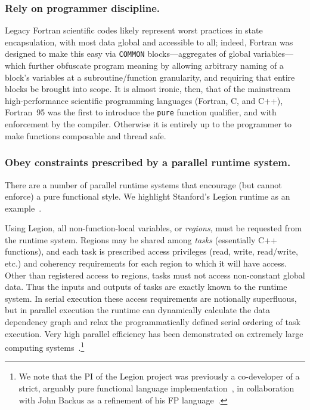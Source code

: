 \documentclass{llncs}
\begin{document}
\subsubsection{Rely on programmer discipline.}
Legacy Fortran scientific codes likely represent worst practices in state
encapsulation, with most data global and accessible to all; indeed, Fortran
was designed to make this easy via \texttt{COMMON} blocks---aggregates of
global variables---which further obfuscate program meaning by allowing
arbitrary naming of a block's variables at a subroutine/function granularity,
and requiring that entire blocks be brought into scope.  It is almost ironic,
then, that of the mainstream high-performance scientific programming languages
(Fortran, C, and C++), Fortran~95 was the first to introduce the \texttt{pure}
function qualifier, and with enforcement by the compiler.  Otherwise it is
entirely up to the programmer to make functions composable and thread safe.

\subsubsection{Obey constraints prescribed by a parallel runtime system.}
There are a number of parallel runtime systems that encourage (but cannot
enforce) a pure functional style.  We highlight Stanford's Legion
runtime as an example~\cite{Bauer12}.

Using Legion, all non-function-local variables, or \emph{regions}, must be
requested from the runtime system.  Regions may be shared among \emph{tasks}
(essentially C++ functions), and each task is prescribed access privileges
(read, write, read/write, etc.) and coherency requirements for each region to
which it will have access.  Other than registered access to regions, tasks
must not access non-constant global data.  Thus the inputs and outputs of
tasks are exactly known to the runtime system.  In serial execution these
access requirements are notionally superfluous, but in parallel execution the
runtime can dynamically calculate the data dependency graph and relax the
programmatically defined serial ordering of task execution.  Very high
parallel efficiency has been demonstrated on extremely large computing
systems~\cite{Bauer14}.\footnote{We note that the PI of the Legion project was
  previously a co-developer of a strict, arguably pure functional language
  implementation~\cite{AikenFL,FLreport89}, in collaboration with John Backus
  as a refinement of his FP language~\cite{Backus:1978}.}
\end{document}

